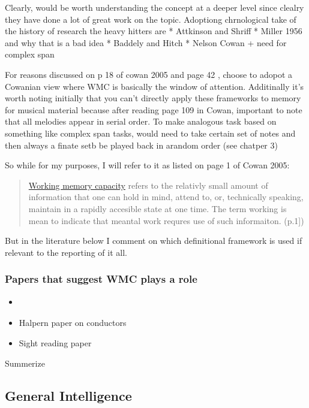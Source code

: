 \documentclass[]{book}
\providecommand{\tightlist}{%
  \setlength{\itemsep}{0pt}\setlength{\parskip}{0pt}}
\theoremstyle{definition}
\theoremstyle{definition}
\theoremstyle{definition}
\theoremstyle{remark}
\begin{document}
Clearly, would be worth understanding the concept at a deeper level
since clealry they have done a lot of great work on the topic. Adoptiong
chrnological take of the history of research the heavy hitters are *
Attkinson and Shriff * Miller 1956 and why that is a bad idea * Baddely
and Hitch * Nelson Cowan + need for complex span

For reasons discussed on p 18 of cowan 2005 and page 42 , choose to
adopot a Cowanian view where WMC is basically the window of attention.
Additinally it's worth noting initially that you can't directly apply
these frameworks to memory for musical material because after reading
page 109 in Cowan, important to note that all melodies appear in serial
order. To make analogous task based on something like complex span
tasks, would need to take certain set of notes and then always a finate
setb be played back in arandom order (see chatper 3)

So while for my purposes, I will refer to it as listed on page 1 of
Cowan 2005:

\begin{quote}
\protect\hyperlink{working-memory-capacity}{Working memory capacity}
refers to the relativly small amount of information that one can hold in
mind, attend to, or, technically speaking, maintain in a rapidly
accesible state at one time. The term working is mean to indicate that
meantal work requres use of such informaiton. (p.1{]})
\end{quote}

But in the literature below I comment on which definitional framework is
used if relevant to the reporting of it all.

\hypertarget{papers-that-suggest-wmc-plays-a-role}{%
\subsubsection{Papers that suggest WMC plays a
role}\label{papers-that-suggest-wmc-plays-a-role}}

\begin{itemize}
\tightlist
\item
  \citep{nicholsScoreOneJazz2018}
\item
  Halpern paper on conductors
\item
  Sight reading paper
\end{itemize}

Summerize

\hypertarget{general-intelligence}{%
\subsection{General Intelligence}\label{general-intelligence}}
\end{document}
